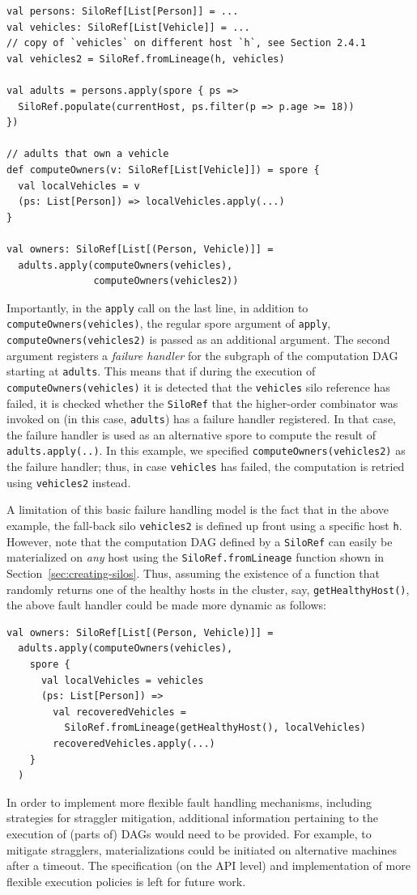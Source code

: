 \documentclass{jfp1}
\begin{document}
\begin{lstlisting}
val persons: SiloRef[List[Person]] = ...
val vehicles: SiloRef[List[Vehicle]] = ...
// copy of `vehicles` on different host `h`, see Section 2.4.1
val vehicles2 = SiloRef.fromLineage(h, vehicles)

val adults = persons.apply(spore { ps =>
  SiloRef.populate(currentHost, ps.filter(p => p.age >= 18))
})

// adults that own a vehicle
def computeOwners(v: SiloRef[List[Vehicle]]) = spore {
  val localVehicles = v
  (ps: List[Person]) => localVehicles.apply(...)
}

val owners: SiloRef[List[(Person, Vehicle)]] =
  adults.apply(computeOwners(vehicles),
               computeOwners(vehicles2))
\end{lstlisting}
\noindent
Importantly, in the \verb|apply| call on the last line, in addition to
\verb|computeOwners(vehicles)|, the regular spore argument of \verb|apply|,
\verb|computeOwners(vehicles2)| is passed as an additional argument. The second
argument registers a {\em failure handler} for the subgraph of the computation
DAG starting at \verb|adults|. This means that if during the execution of
\verb|computeOwners(vehicles)| it is detected that the \verb|vehicles| silo
reference has failed, it is checked whether the \verb|SiloRef| that the
higher-order combinator was invoked on (in this case, \verb|adults|) has a
failure handler registered. In that case, the failure handler is used as an
alternative spore to compute the result of \verb|adults.apply(..)|. In this
example, we specified \verb|computeOwners(vehicles2)| as the failure handler;
thus, in case \verb|vehicles| has failed, the computation is retried using
\verb|vehicles2| instead.

A limitation of this basic failure handling model is the fact that in
the above example, the fall-back silo \verb|vehicles2| is defined up
front using a specific host \verb|h|. However, note that the
computation DAG defined by a \verb|SiloRef| can easily be materialized
on {\em any} host using the \verb|SiloRef.fromLineage| function shown
in Section~\ref{sec:creating-silos}. Thus, assuming the existence of a
function that randomly returns one of the healthy hosts in the
cluster, say, \verb|getHealthyHost()|, the above fault handler could
be made more dynamic as follows:

\begin{lstlisting}
val owners: SiloRef[List[(Person, Vehicle)]] =
  adults.apply(computeOwners(vehicles),
    spore {
      val localVehicles = vehicles
      (ps: List[Person]) =>
        val recoveredVehicles =
          SiloRef.fromLineage(getHealthyHost(), localVehicles)
        recoveredVehicles.apply(...)
    }
  )
\end{lstlisting}
\noindent
In order to implement more flexible fault handling mechanisms,
including strategies for straggler mitigation, additional information
pertaining to the execution of (parts of) DAGs would need to be
provided. For example, to mitigate stragglers, materializations could
be initiated on alternative machines after a timeout. The
specification (on the API level) and implementation of more flexible
execution policies is left for future work.
\end{document}
